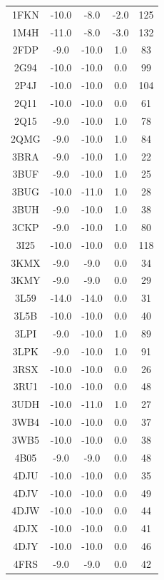 \begin{center}
\begin{longtable}{c c c c c}
      \hline
      1FKN & -10.0 &  -8.0 & -2.0 & 125 \\
      1M4H & -11.0 &  -8.0 & -3.0 & 132 \\
      2FDP &  -9.0 & -10.0 &  1.0 &  83 \\
      2G94 & -10.0 & -10.0 &  0.0 &  99 \\
      2P4J & -10.0 & -10.0 &  0.0 & 104 \\
      2Q11 & -10.0 & -10.0 &  0.0 &  61 \\
      2Q15 &  -9.0 & -10.0 &  1.0 &  78 \\
      2QMG &  -9.0 & -10.0 &  1.0 &  84 \\
      3BRA &  -9.0 & -10.0 &  1.0 &  22 \\
      3BUF &  -9.0 & -10.0 &  1.0 &  25 \\
      3BUG & -10.0 & -11.0 &  1.0 &  28 \\
      3BUH &  -9.0 & -10.0 &  1.0 &  38 \\
      3CKP &  -9.0 & -10.0 &  1.0 &  80 \\
      3I25 & -10.0 & -10.0 &  0.0 & 118 \\
      3KMX &  -9.0 &  -9.0 &  0.0 &  34 \\
      3KMY &  -9.0 &  -9.0 &  0.0 &  29 \\
      3L59 & -14.0 & -14.0 &  0.0 &  31 \\
      3L5B & -10.0 & -10.0 &  0.0 &  40 \\
      3LPI &  -9.0 & -10.0 &  1.0 &  89 \\
      3LPK &  -9.0 & -10.0 &  1.0 &  91 \\
      3RSX & -10.0 & -10.0 &  0.0 &  26 \\
      3RU1 & -10.0 & -10.0 &  0.0 &  48 \\
      3UDH & -10.0 & -11.0 &  1.0 &  27 \\
      3WB4 & -10.0 & -10.0 &  0.0 &  37 \\
      3WB5 & -10.0 & -10.0 &  0.0 &  38 \\
      4B05 &  -9.0 &  -9.0 &  0.0 &  48 \\
      4DJU & -10.0 & -10.0 &  0.0 &  35 \\
      4DJV & -10.0 & -10.0 &  0.0 &  49 \\
      4DJW & -10.0 & -10.0 &  0.0 &  44 \\
      4DJX & -10.0 & -10.0 &  0.0 &  41 \\
      4DJY & -10.0 & -10.0 &  0.0 &  46 \\
      4FRS &  -9.0 &  -9.0 &  0.0 &  42 \\

\end{longtable}
\end{center}
